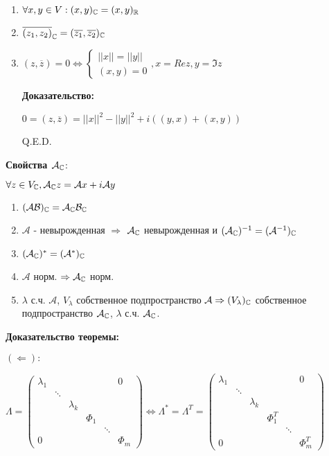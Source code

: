 \begin{enumerate}
    \item $\forall x,y \in V: (x,y)_{\mathbb{C}} = (x,y)_{\mathbb{R}}$
    \item $\overline{(z_1,z_2)}_{\mathbb{C}} = (\overline{z_1},\overline{z_2})_{\mathbb{C}}$
    \item $(z,\overline{z}) = 0 \Leftrightarrow \begin{cases}
        ||x|| =||y|| \\
        (x,y) = 0
    \end{cases}, x = Re z, y = \Im z$

    \textbf{Доказательство:}

    $0 = (z,\overline{z})= ||x||^2 -||y||^2 + i((y,x) + (x,y))$

    \hfill Q.E.D.
\end{enumerate}




\textbf{Свойства $\mathcal{A}_{\mathbb{C}}$}:

$\forall z \in V_{\mathbb{C}}, \mathcal{A}_{\mathbb{C}} z=\mathcal{A}x + i \mathcal{A}y$

\begin{enumerate}
    \item $(\mathcal{A}\mathcal{B})_{\mathbb{C}} = \mathcal{A}_{\mathbb{C}} \mathcal{B}_{\mathbb{C}}$
    \item $\mathcal{A}$ -  невырожденная $\Rightarrow$ $\mathcal{A}_{\mathbb{C}}$ невырожденная и $(\mathcal{A}_{\mathbb{C}})^{-1} = (\mathcal{A}^{-1})_{\mathbb{C}}$
    \item $(\mathcal{A}_{\mathbb{C}})^* = (\mathcal{A}^*)_{\mathbb{C}}$
    
    \item $\mathcal{A}$ норм. $\Rightarrow \mathcal{A}_{\mathbb{C}}$ норм.
    \item $\lambda$ с.ч. $\mathcal{A}$, $V_{\lambda}$ собственное подпространство $\mathcal{A} \Rightarrow (V_{\lambda})_{\mathbb{C}}$ собственное подпространство $\mathcal{A}_{\mathbb{C}}$, $\lambda$ с.ч. $\mathcal{A}_{\mathbb{C}}$. 
\end{enumerate}

\textbf{Доказательство теоремы:}

 $(\Leftarrow):$

$\Lambda = \begin{pmatrix}
    \lambda_1 & & & & &0\\
    & \ddots & & & &\\
    & & \lambda_k & & &\\
    & & & \Phi_1 & &\\
    & & & & \ddots & \\
    0& & & & & \Phi_m
\end{pmatrix} \Leftrightarrow\Lambda^* = \Lambda^T = \begin{pmatrix}
    \lambda_1 & & & & &0\\
    & \ddots & & & &\\
    & & \lambda_k & & &\\
    & & & \Phi_1^T & &\\
    & & & & \ddots & \\
    0& & & & & \Phi_m^T
\end{pmatrix}$ 

